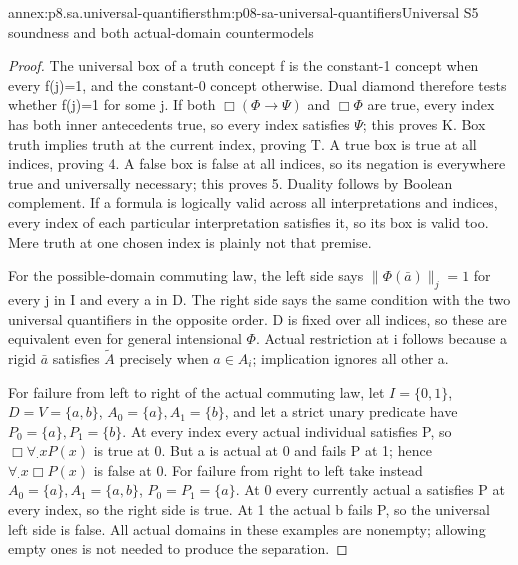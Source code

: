 \begin{annexitem}{annex:p8.sa.universal-quantifiers}{thm:p08-sa-universal-quantifiers}{Universal S5 soundness and both actual-domain countermodels}
\begin{proof}
The universal box of a truth concept f is the constant-1 concept
when every f(j)=1, and the constant-0 concept otherwise. Dual
diamond therefore tests whether f(j)=1 for some j. If both
\(\Box(\Phi\to\Psi)\) and \(\Box\Phi\) are true,
every index has both inner antecedents true, so every index
satisfies \(\Psi\); this proves K. Box truth implies truth
at the current index, proving T. A true box is true at all
indices, proving 4. A false box is false at all indices, so
its negation is everywhere true and universally necessary;
this proves 5. Duality follows by Boolean complement. If a
formula is logically valid across all interpretations and
indices, every index of each particular interpretation satisfies
it, so its box is valid too. Mere truth at one chosen index
is plainly not that premise.

For the possible-domain commuting law, the left side says
\(\|\Phi(\bar a)\|_j=1\) for every j in I and every
a in D. The right side says the same condition with the two
universal quantifiers in the opposite order. D is fixed over
all indices, so these are equivalent even for general intensional
\(\Phi\). Actual restriction at i follows because a rigid
\(\bar a\) satisfies \(\widetilde A\) precisely when
\(a\in A_i\); implication ignores all other a.

For failure from left to right of the actual commuting law,
let \(I=\{0,1\}\), \(D=V=\{a,b\}\),
\(A_0=\{a\},A_1=\{b\}\), and let a strict unary
predicate have \(P_0=\{a\},P_1=\{b\}\).
At every index every actual individual satisfies P, so
\(\Box\forall_{\cdot}xP(x)\) is true at 0.
But a is actual at 0 and fails P at 1; hence
\(\forall_{\cdot}x\Box P(x)\) is false at 0.
For failure from right to left take instead
\(A_0=\{a\},A_1=\{a,b\}\),
\(P_0=P_1=\{a\}\). At 0 every currently actual a
satisfies P at every index, so the right side is true. At 1
the actual b fails P, so the universal left side is false.
All actual domains in these examples are nonempty; allowing
empty ones is not needed to produce the separation.
\end{proof}
\end{annexitem}


